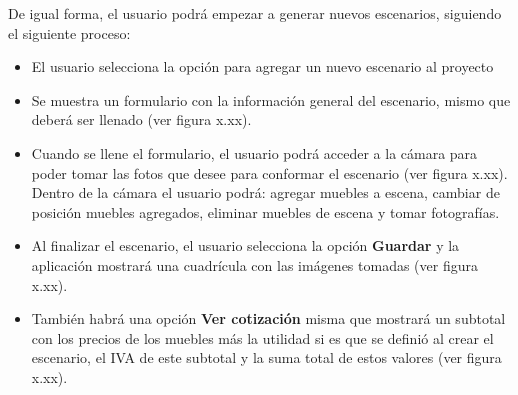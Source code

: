 \clearpage

De igual forma, el usuario podrá empezar a generar nuevos escenarios, siguiendo el siguiente proceso:
\begin{itemize}
	\item El usuario selecciona la opción para agregar un nuevo escenario al proyecto
	\item Se muestra un formulario con la información general del escenario, mismo que deberá ser llenado (ver figura x.xx).
	\item Cuando se llene el formulario, el usuario podrá acceder a la cámara para poder tomar las fotos que desee para conformar el escenario (ver figura x.xx). Dentro de la cámara el usuario podrá: agregar muebles a escena, cambiar de posición muebles agregados, eliminar muebles de escena y tomar fotografías.
	\item Al finalizar el escenario, el usuario selecciona la opción \textbf{Guardar} y la aplicación mostrará una cuadrícula con las imágenes tomadas (ver figura x.xx).
	\item También habrá una opción \textbf{Ver cotización} misma que mostrará un subtotal con los precios de los muebles más la utilidad si es que se definió al crear el escenario, el IVA de este subtotal y la suma total de estos valores (ver figura x.xx).
\end{itemize}


